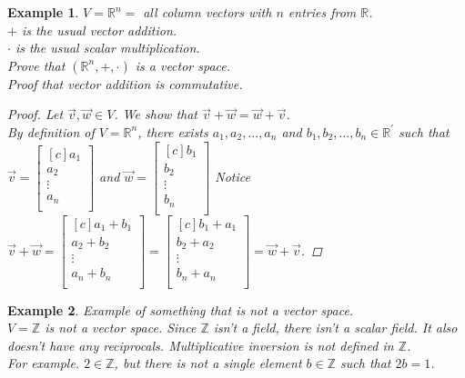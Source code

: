 \documentclass{report}
\newcommand{\Z}{\mathbb{Z}}
\newtheorem*{ex}{Example}
\begin{document}
\begin{ex}
$V= \mathbb{R}^n =$ all column vectors with $n$ entries from $\mathbb{R}$.\\
$+$ is the usual vector addition.\\
$\cdot$ is the usual scalar multiplication.\\
Prove that $(\mathbb{R}^n,+,\cdot)$ is a vector space.\\
Proof that vector addition is commutative.
\begin{proof}
	Let $\vec{v}, \vec{w} \in V$. We show that $\vec{v} + \vec{w} = \vec{w} + \vec{v}$.\\
	By definition of $V=\mathbb{R}^n$, there exists $a_1,a_2,...,a_n$ and $b_1,b_2,...,b_n \in \mathbb{R}^\prime$ such that $\vec{v} = \begin{bmatrix}[c] a_1\\ a_2\\ \vdots\\ a_n\\ \end{bmatrix}$ and $\vec{w} = \begin{bmatrix}[c] b_1\\ b_2\\ \vdots\\ b_n\\ \end{bmatrix}$
	Notice $\vec{v} + \vec{w} = \begin{bmatrix}[c] a_1+b_1\\ a_2+b_2\\ \vdots\\ a_n+b_n\\ \end{bmatrix} = \begin{bmatrix}[c] b_1+a_1\\ b_2+a_2\\ \vdots\\ b_n+a_n\\ \end{bmatrix} = \vec{w} + \vec{v}$. 
\end{proof}
\end{ex}

\begin{ex}
Example of something that is not a vector space.\\
$V=\Z$ is not a vector space. Since $\Z$ isn't a field, there isn't a scalar field. It also doesn't have any reciprocals. Multiplicative inversion is not defined in $\Z$.\\
For example. $2 \in \Z$, but there is not a single element $b \in \Z$ such that $2b = 1$.
\end{ex}
\end{document}
